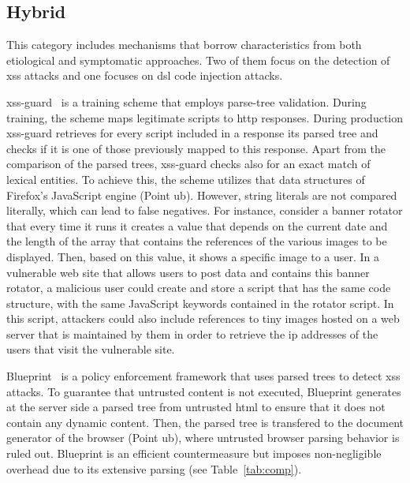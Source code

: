 \documentclass[10pt,journal,compsoc]{IEEEtran}
\begin{document}
\subsection{Hybrid}
\label{sec:hybrid}

This category includes mechanisms that borrow
characteristics from both etiological and symptomatic approaches.
Two of them focus on the detection of {\sc xss}
attacks and one focuses on {\sc dsl} code injection attacks.

{\sc xss-guard}~\cite{BV08} is a training scheme that employs
parse-tree validation. During training, the scheme maps legitimate
scripts to {\sc http} responses. During production {\sc xss-guard}
retrieves for every script included in a response its parsed tree and
checks if it is one of those previously mapped to this response. Apart
from the comparison of the parsed trees, {\sc xss-guard} checks also
for an exact match of lexical entities. To achieve this, the scheme
utilizes that data structures of Firefox's JavaScript engine (Point
{\sc ub}). However, string literals are not compared literally, which
can lead to false negatives. For instance, consider a banner rotator
that every time it runs it creates a value that depends on the
current date and the length of the array that contains the references
of the various images to be displayed. Then, based on this value, it
shows a specific image to a user. In a vulnerable web site that allows
users to post data and contains this banner rotator, a malicious user
could create and store a script that has the same code structure, with
the same JavaScript keywords contained in the rotator script.
In this script, attackers could also include references to tiny
images hosted on a web server that is maintained by them in order to
retrieve the {\sc ip} addresses of the users that visit the vulnerable
site.

Blueprint~\cite{LV09} is a policy enforcement framework that
uses parsed trees to detect {\sc xss} attacks. To guarantee
that untrusted content is not executed, Blueprint generates at the
server side a parsed tree from untrusted {\sc html} to ensure that it
does not contain any dynamic content. Then, the parsed tree is
transfered to the document generator of the browser (Point {\sc ub}),
where untrusted browser parsing behavior is ruled out.
Blueprint is an efficient countermeasure but imposes non-negligible
overhead due to its extensive parsing (see Table~\ref{tab:comp}).
\end{document}

